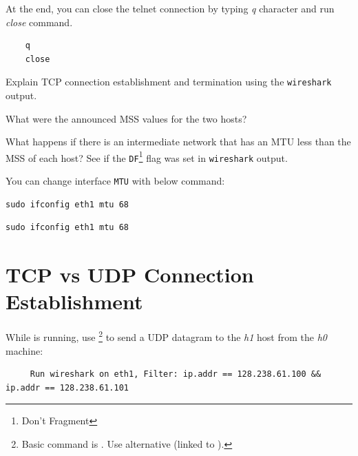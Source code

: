 \documentclass{UTNetLab}
\begin{document}
	At the end, you can close the telnet connection by typing \textit{q} character and run \textit{close} command.

\begin{lstlisting}
	q
	close
\end{lstlisting}
   
    \begin{report}
        \item Explain TCP connection establishment and termination using the \lstinline{wireshark} output.
        
        \item What were the announced MSS values for the two hosts?
        
        \item What happens if there is an intermediate network that has an MTU less than the MSS of each host?
    	See if the \texttt{DF}\footnote{Don't Fragment} flag was set in \lstinline{wireshark} output.
    
    	You can change interface \texttt{MTU} with below command:
	
		\begin{lstlisting}[emph=$eth]
sudo ifconfig eth1 mtu 68
		\end{lstlisting}
	
		\begin{lstlisting}[emph=$eth]
sudo ifconfig eth1 mtu 68
		\end{lstlisting}

    \end{report}
    
\section{TCP vs UDP Connection Establishment}
    
    While  is running, use \footnote{Basic command is . Use alternative  (linked to ).} to send a UDP datagram to the \textit{h1} host from the \textit{h0} machine:
    
     \begin{lstlisting}
     Run wireshark on eth1, Filter: ip.addr == 128.238.61.100 && ip.addr == 128.238.61.101

     \end{lstlisting}  
    
\end{document}
